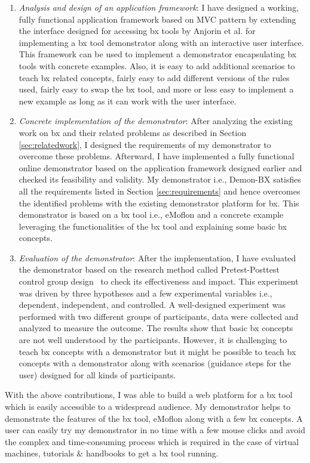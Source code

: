 \begin{enumerate}
	\item {\textit{Analysis and design of an application framework}: I have designed a working, fully functional application framework based on MVC pattern by extending the interface designed for accessing bx tools by Anjorin et al. \cite{benchmarx-reload} for implementing a bx tool demonstrator along with an interactive user interface. This framework can be used to implement a demonstrator encapsulating bx tools with concrete examples. Also, it is easy to add additional scenarios to teach bx related concepts, fairly easy to add different versions of the rules used, fairly easy to swap the bx tool, and more or less easy to implement a new example as long as it can work with the user interface.}
    \item {\textit{Concrete implementation of the demonstrator}: After analyzing the existing work on bx and their related problems as described in Section \ref{sec:relatedwork}, I designed the requirements of my demonstrator to overcome these problems. Afterward, I have implemented a fully functional online demonstrator based on the application framework designed earlier and checked its feasibility and validity. My demonstrator i.e., Demon-BX satisfies all the requirements listed in Section \ref{sec:requirements} and hence overcomes the identified problems with the existing demonstrator platform for bx. This demonstrator is based on a bx tool i.e., eMoflon and a concrete example leveraging the functionalities of the bx tool and explaining some basic bx concepts.}
    \item {\textit{Evaluation of the demonstrator}: After the implementation, I have evaluated the demonstrator based on the research method called Pretest-Posttest control group design~\cite{expandquasiexpdesign} to check its effectiveness and impact. This experiment was driven by three hypotheses and a few experimental variables i.e., dependent, independent, and controlled. A well-designed experiment was performed with two different groups of participants, data were collected and analyzed to measure the outcome. The results show that basic bx concepts are not well understood by the participants. However, it is challenging to teach bx concepts with a demonstrator but it might be possible to teach bx concepts with a demonstrator along with scenarios (guidance steps for the user) designed for all kinds of participants.}	
\end{enumerate}

With the above contributions, I was able to build a web platform for a bx tool which is easily accessible to a widespread audience. My demonstrator helps to demonstrate the features of the bx tool, eMoflon along with a few bx concepts. A user can easily try my demonstrator in no time with a few mouse clicks and avoid the complex and time-consuming process which is required in the case of virtual machines, tutorials \& handbooks to get a bx tool running. 

